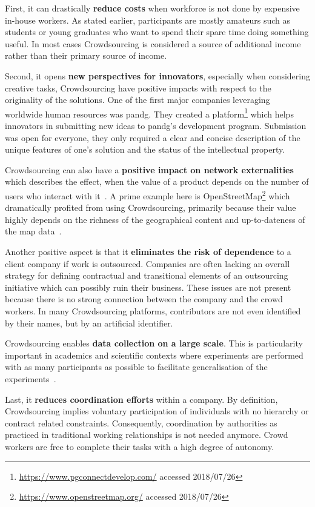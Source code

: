 First, it can drastically \textbf{reduce costs} when workforce is not done by expensive in-house workers. As stated earlier, participants are mostly amateurs such as students or young graduates who want to spend their spare time doing something useful. In most cases Crowdsourcing is considered a source of additional income rather than their primary source of income. 

Second, it opens \textbf{new perspectives for innovators}, especially when considering creative tasks, Crowdsourcing have positive impacts with respect to the originality of the solutions. One of the first major companies leveraging worldwide human resources was \gls{pandg}. They created a platform\footnote{\url{https://www.pgconnectdevelop.com/} accessed 2018/07/26} which helps innovators in submitting new ideas to \gls{pandg}'s development program. Submission was open for everyone, they only required a clear and concise description of the unique features of one's solution and the status of the intellectual property. 

Crowdsourcing can also have a \textbf{positive impact on network externalities} which describes the effect, when the value of a product depends on the number of users who interact with it~\cite{shapiro1998}. A prime example here is OpenStreetMap\footnote{\url{https://www.openstreetmap.org/} accessed 2018/07/26} which dramatically profited from using Crowdsourcing, primarily because their value highly depends on the richness of the geographical content and up-to-dateness of the map data~\cite{chilton2009}. 

Another positive aspect is that it \textbf{eliminates the risk of dependence} to a client company if work is outsourced. Companies are often lacking an overall strategy for defining contractual and transitional elements of an outsourcing initiative which can possibly ruin their business. These issues are not present because there is no strong connection between the company and the crowd workers. In many Crowdsourcing platforms, contributors are not even identified by their names, but by an artificial identifier. 

Crowdsourcing enables \textbf{data collection on a large scale}. This is particularity important in academics and scientific contexts where experiments are performed with as many participants as possible to facilitate generalisation of the experiments~\cite{gadiraju2017}. 

Last, it \textbf{reduces coordination efforts} within a company. By definition, Crowdsourcing implies voluntary participation of individuals with no hierarchy or contract related constraints. Consequently, coordination by authorities as practiced in traditional working relationships is not needed anymore. Crowd workers are free to complete their tasks with a high degree of autonomy. 

